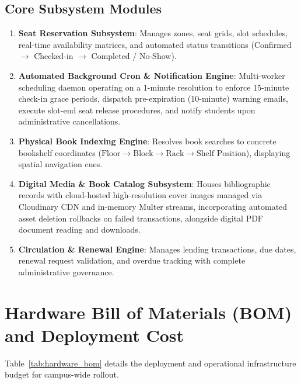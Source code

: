 \subsection{Core Subsystem Modules}
\begin{enumerate}
    \item \textbf{Seat Reservation Subsystem}: Manages zones, seat grids, slot schedules, real-time availability matrices, and automated status transitions (Confirmed $\rightarrow$ Checked-in $\rightarrow$ Completed / No-Show).
    \item \textbf{Automated Background Cron \& Notification Engine}: Multi-worker scheduling daemon operating on a 1-minute resolution to enforce 15-minute check-in grace periods, dispatch pre-expiration (10-minute) warning emails, execute slot-end seat release procedures, and notify students upon administrative cancellations.
    \item \textbf{Physical Book Indexing Engine}: Resolves book searches to concrete bookshelf coordinates ($\text{Floor} \rightarrow \text{Block} \rightarrow \text{Rack} \rightarrow \text{Shelf Position}$), displaying spatial navigation cues.
    \item \textbf{Digital Media \& Book Catalog Subsystem}: Houses bibliographic records with cloud-hosted high-resolution cover images managed via Cloudinary CDN and in-memory Multer streams, incorporating automated asset deletion rollbacks on failed transactions, alongside digital PDF document reading and downloads.
    \item \textbf{Circulation \& Renewal Engine}: Manages lending transactions, due dates, renewal request validation, and overdue tracking with complete administrative governance.
\end{enumerate}

\section{Hardware Bill of Materials (BOM) and Deployment Cost}
Table~\ref{tab:hardware_bom} details the deployment and operational infrastructure budget for campus-wide rollout.

